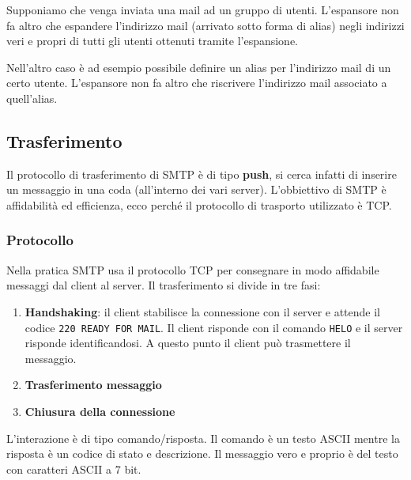 Supponiamo che venga inviata una mail ad un gruppo di utenti. 
L'espansore non fa altro che espandere l'indirizzo mail (arrivato sotto
forma di alias) negli indirizzi veri e propri di tutti gli utenti
ottenuti tramite l'espansione.

Nell'altro caso è ad esempio possibile definire un alias per 
l'indirizzo mail di un certo utente. L'espansore non fa altro che
riscrivere l'indirizzo mail associato a quell'alias.

\subsection{Trasferimento}
Il protocollo di trasferimento di SMTP è di tipo \textbf{push}, si 
cerca infatti di inserire un messaggio in una coda (all'interno dei 
vari server). L'obbiettivo di SMTP è affidabilità ed efficienza, ecco 
perché il protocollo di trasporto utilizzato è TCP.

\subsubsection{Protocollo}
Nella pratica SMTP usa il protocollo TCP per consegnare in modo 
affidabile messaggi dal client al server. Il trasferimento si divide in
tre fasi:
\begin{enumerate}
	\item \textbf{Handshaking}: il client stabilisce la connessione 
		con il server e attende il codice \verb|220 READY FOR MAIL|. Il
		client risponde con il comando \verb|HELO| e il server risponde
		identificandosi. A questo punto il client può trasmettere il 
		messaggio.
	\item \textbf{Trasferimento messaggio}
	\item \textbf{Chiusura della connessione}
\end{enumerate}
L'interazione è di tipo comando/risposta. Il comando è un testo ASCII 
mentre la risposta è un codice di stato e descrizione. Il messaggio
vero e proprio è del testo con caratteri ASCII a 7 bit.

